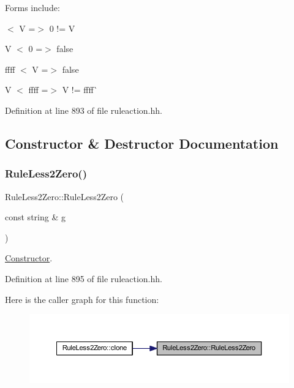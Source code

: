Forms include\+:
\begin{DoxyItemize}
\item { $<$ V =$>$ 0 != V}
\item {\ttfamily V $<$ 0 =$>$ false}
\item {\ttfamily ffff $<$ V =$>$ false}
\item {\ttfamily V $<$ ffff} =$>$ V != ffff\`{} 
\end{DoxyItemize}

Definition at line 893 of file ruleaction.\+hh.



\subsection{Constructor \& Destructor Documentation}
\mbox{\label{class_rule_less2_zero_a4b2b01edd91cf591fe3c4b3c59579a85}} 
\subsubsection{\texorpdfstring{RuleLess2Zero()}{RuleLess2Zero()}}
{\footnotesize\ttfamily Rule\+Less2\+Zero\+::\+Rule\+Less2\+Zero (\begin{DoxyParamCaption}\item[{const string \&}]{g }\end{DoxyParamCaption})\hspace{0.3cm}{\ttfamily [inline]}}



\mbox{\hyperlink{class_constructor}{Constructor}}. 



Definition at line 895 of file ruleaction.\+hh.

Here is the caller graph for this function\+:
\nopagebreak
\begin{figure}[H]
\begin{center}
\leavevmode
\includegraphics[width=350pt]{class_rule_less2_zero_a4b2b01edd91cf591fe3c4b3c59579a85_icgraph}
\end{center}
\end{figure}


